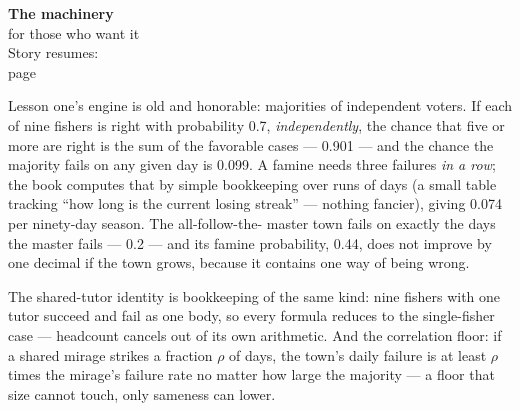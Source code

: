 \begin{machinery}{\textbf{The machinery}\\for those who want it\\[3pt]{\color{muted}Story resumes:\\page~\pageref{ch12}}}

Lesson one's engine is old and honorable: majorities of independent
voters. If each of nine fishers is right with probability 0.7,
\emph{independently}, the chance that five or more are right is the sum of
the favorable cases --- 0.901 --- and the chance the majority fails on
any given day is 0.099. A famine needs three failures \emph{in a row}; the
book computes that by simple bookkeeping over runs of days (a small
table tracking ``how long is the current losing streak'' --- nothing
fancier), giving 0.074 per ninety-day season. The all-follow-the-
master town fails on exactly the days the master fails --- 0.2 --- and
its famine probability, 0.44, does not improve by one decimal if the
town grows, because it contains one way of being wrong.


The shared-tutor identity is bookkeeping of the same kind: nine
fishers with one tutor succeed and fail as one body, so every formula
reduces to the single-fisher case --- headcount cancels out of its own
arithmetic. And the correlation floor: if a shared mirage strikes a
fraction \(\rho\) of days, the town's daily failure is at least \(\rho\) times the
mirage's failure rate no matter how large the majority --- a floor that
size cannot touch, only sameness can lower.



\end{machinery}
